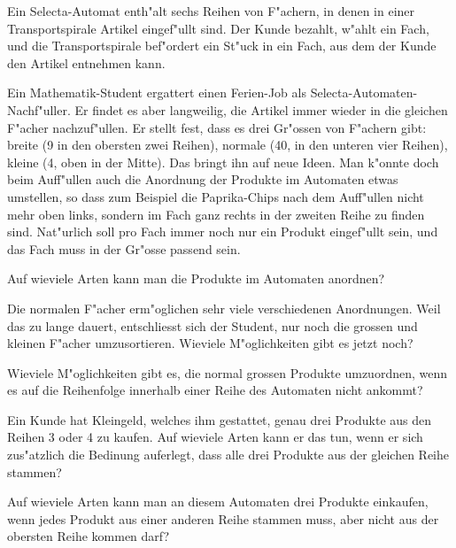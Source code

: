 Ein Selecta-Automat enth"alt sechs Reihen von F"achern, in denen in einer
Transportspirale Artikel eingef"ullt sind. Der Kunde bezahlt, w"ahlt ein
Fach, und die Transportspirale bef"ordert ein St"uck in ein Fach, aus dem
der Kunde den Artikel entnehmen kann.
\begin{center}
\end{center}
Ein Mathematik-Student ergattert einen Ferien-Job als
Selecta-Automaten-Nachf"uller. Er findet es aber langweilig, die Artikel
immer wieder in die gleichen F"acher nachzuf"ullen. Er stellt fest,
dass es drei Gr"ossen von F"achern gibt: breite (9 in den obersten zwei Reihen),
normale (40, in den unteren vier Reihen), kleine (4, oben in der Mitte).
Das bringt ihn auf neue Ideen. Man k"onnte doch beim Auff"ullen auch die 
Anordnung der Produkte im Automaten etwas umstellen, so dass zum Beispiel
die Paprika-Chips nach dem Auff"ullen nicht mehr oben links, sondern im
Fach ganz rechts in der zweiten Reihe zu finden sind. Nat"urlich soll
pro Fach immer noch nur ein Produkt eingef"ullt sein, und das Fach muss
in der Gr"osse passend sein.
\begin{teilaufgaben}
\item
Auf wieviele Arten kann man die Produkte im Automaten anordnen?
\item
Die normalen F"acher erm"oglichen sehr viele verschiedenen Anordnungen.
Weil das zu lange dauert, entschliesst sich der Student, nur noch die
grossen und kleinen F"acher umzusortieren. Wieviele M"oglichkeiten
gibt es jetzt noch?
\item
Wieviele M"oglichkeiten gibt es, die normal grossen Produkte
umzuordnen, wenn es auf die Reihenfolge innerhalb einer Reihe des
Automaten nicht ankommt?
\item 
Ein Kunde hat Kleingeld, welches ihm gestattet, genau drei Produkte
aus den Reihen 3 oder 4 zu kaufen. Auf wieviele Arten kann er
das tun, wenn er sich zus"atzlich die Bedinung auferlegt, dass alle
drei Produkte aus der gleichen Reihe stammen?
\item
Auf wieviele Arten kann man an diesem Automaten drei Produkte einkaufen, wenn
jedes Produkt aus einer anderen Reihe stammen muss, aber nicht aus
der obersten Reihe kommen darf?
\end{teilaufgaben}

